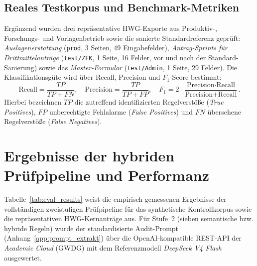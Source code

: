 \subsection{Reales Testkorpus und Benchmark-Metriken}
Ergänzend wurden drei repräsentative HWG-Exporte aus Produktiv-, Forschungs- und Vorlagenbetrieb sowie die sanierte Standardreferenz geprüft: \textit{Auslagenerstattung} (\texttt{prod}, 3 Seiten, 49 Eingabefelder), \textit{Antrag-Sprints für Drittmittelanträge} (\texttt{test/ZFK}, 1 Seite, 16 Felder, vor und nach der Standard-Sanierung) sowie das \textit{Master-Formular} (\texttt{test/Admin}, 1 Seite, 29 Felder). Die Klassifikationsgüte wird über Recall, Precision und $F_1$-Score bestimmt:
\begin{equation}
    \text{Recall} = \frac{TP}{TP + FN}, \quad \text{Precision} = \frac{TP}{TP + FP}, \quad F_1 = 2 \cdot \frac{\text{Precision} \cdot \text{Recall}}{\text{Precision} + \text{Recall}}.
    \label{eq:f1_metric}
\end{equation}
Hierbei bezeichnen $TP$ die zutreffend identifizierten Regelverstöße (\textit{True Positives}), $FP$ unberechtigte Fehlalarme (\textit{False Positives}) und $FN$ übersehene Regelverstöße (\textit{False Negatives}).

\section{Ergebnisse der hybriden Prüfpipeline und Performanz}
\label{sec:benchmark_ergebnisse}

Tabelle~\ref{tab:eval_results} weist die empirisch gemessenen Ergebnisse der vollständigen zweistufigen Prüfpipeline für das synthetische Kontrollkorpus sowie die repräsentativen HWG-Kernanträge aus. Für Stufe~2 (sieben semantische bzw. hybride Regeln) wurde der standardisierte Audit-Prompt (Anhang~\ref{app:prompt_extrakt}) über die OpenAI-kompatible REST-API der \textit{Academic Cloud} (GWDG) mit dem Referenzmodell \textit{DeepSeek V4 Flash} ausgewertet.


